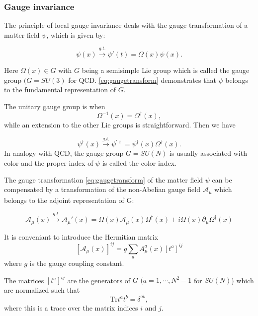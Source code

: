 \subsubsection{Gauge invariance}
The principle of local gauge invariance deals with the gauge transformation of
a matter field $\psi$, which is given by:

\begin{equation}
  \psi(x)\xrightarrow{g.t.}\psi'(t) = \Omega(x)\psi(x).
  \label{eq:gaugetransform}
\end{equation}

Here $\Omega(x)\in G$ with $G$ being a semisimple Lie group which is called the
gauge group $(G=SU(3)$ for QCD. \eqref{eq:gaugetransform} demonstrates
that $\psi$ belongs to the fundamental representation of $G$.
\par The unitary gauge group is when
\begin{equation}
  \Omega^{-1}(x) = \Omega^\dagger(x),
\end{equation}
while an extension to the other Lie groups is straightforward. 
Then we have

\begin{equation}
  \psi^\dagger(x) \xrightarrow{g.t.} \psi^{'\dagger}
  = \psi^\dagger(x)\Omega^\dagger(x).
\end{equation}
In analogy with QCD, the gauge group $G=SU(N)$ is usually associated with color
and the proper index of $\psi$ is called the color index.
\par The gauge transformation \eqref{eq:gaugetransform} of the matter field
$\psi$ can be compensated by a transformation of the non-Abelian gauge field
$\mathcal{A}_\mu$ which belongs to the adjoint representation of G:

\begin{equation}
  \mathcal{A}_\mu(x)\xrightarrow{g.t.}\mathcal{A}_\mu'(x)
  = \Omega(x)\mathcal{A}_\mu(x)\Omega^\dagger(x)
  + i\Omega(x)\partial_\mu\Omega^\dagger(x)
  \label{eq:nonabeliangaugetransform}
\end{equation}

It is conveniant to introduce the Hermitian matrix
\begin{equation}
  \left[\mathcal{A}_\mu(x)\right]^{ij}
  = g\sum_a{A^a_\mu(x)\left[t^a\right]^{ij}}
  \label{eq:hermitianmatrix}
\end{equation}
where $g$ is the gauge coupling constant.
\par The matrices $[t^a]^{ij}$ are the generators of $G$ $(a=1,\cdots,N^2-1$
for $SU(N)$) which are normalized such that
\begin{equation}
  \mathrm{Tr}t^at^b = \delta^{ab},
\end{equation}
where this is a trace over the matrix indices $i$ and $j$.

